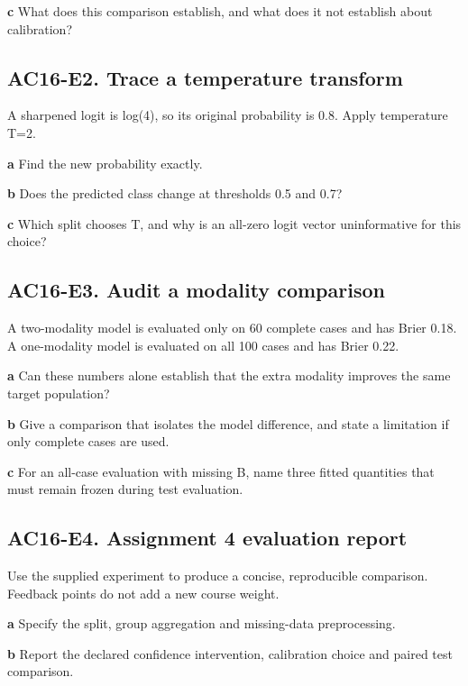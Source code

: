 \documentclass[11pt,letterpaper]{article}
\theoremstyle{definition}\newtheorem{definition}{Definition}\newtheorem{example}{Example}
\numberwithin{equation}{section}
\begin{document}
\textbf{c} What does this comparison establish, and what does it not establish about calibration?

\par\noindent\begin{minipage}{\linewidth}
\subsection*{AC16-E2. Trace a temperature transform}
A sharpened logit is log(4), so its original probability is 0.8. Apply temperature T=\allowbreak{}2.

\textbf{a} Find the new probability exactly.

\end{minipage}\par\medskip
\textbf{b} Does the predicted class change at thresholds 0.5 and 0.7?

\textbf{c} Which split chooses T, and why is an all-zero logit vector uninformative for this choice?

\par\noindent\begin{minipage}{\linewidth}
\subsection*{AC16-E3. Audit a modality comparison}
A two-modality model is evaluated only on 60 complete cases and has Brier 0.18. A one-modality model is evaluated on all 100 cases and has Brier 0.22.

\textbf{a} Can these numbers alone establish that the extra modality improves the same target population?

\end{minipage}\par\medskip
\textbf{b} Give a comparison that isolates the model difference, and state a limitation if only complete cases are used.

\textbf{c} For an all-case evaluation with missing B, name three fitted quantities that must remain frozen during test evaluation.

\par\noindent\begin{minipage}{\linewidth}
\subsection*{AC16-E4. Assignment 4 evaluation report}
Use the supplied experiment to produce a concise, reproducible comparison. Feedback points do not add a new course weight.

\textbf{a} Specify the split, group aggregation and missing-data preprocessing.

\end{minipage}\par\medskip
\textbf{b} Report the declared confidence intervention, calibration choice and paired test comparison.
\end{document}
